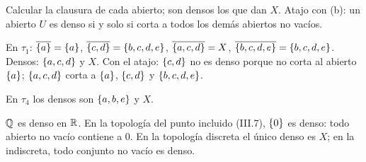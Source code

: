 \begin{metodo}
Calcular la clausura de cada abierto; son densos los que dan $X$. Atajo con (b): un abierto $U$ es denso si y solo si
corta a todos los demás abiertos no vacíos.
\end{metodo}
\begin{ejemplo}
En $\tau_1$: $\overline{\{a\}}=\{a\}$, $\overline{\{c,d\}}=\{b,c,d,e\}$, $\overline{\{a,c,d\}}=X$, $\overline{\{b,c,d,e\}}=\{b,c,d,e\}$. Densos:
$\{a,c,d\}$ y $X$. Con el atajo: $\{c,d\}$ no es denso porque no corta al abierto $\{a\}$; $\{a,c,d\}$ corta a
$\{a\}$, $\{c,d\}$ y $\{b,c,d,e\}$.

En $\tau_4$ los densos son $\{a,b,e\}$ y $X$.
\end{ejemplo}
\begin{ejemplo}
$\mathbb{Q}$ es denso en $\mathbb{R}$. En la topología del punto incluido (III.7), $\{0\}$ es denso: todo abierto no vacío contiene a
$0$. En la topología discreta el único denso es $X$; en la indiscreta, todo conjunto no vacío es denso.
\end{ejemplo}
